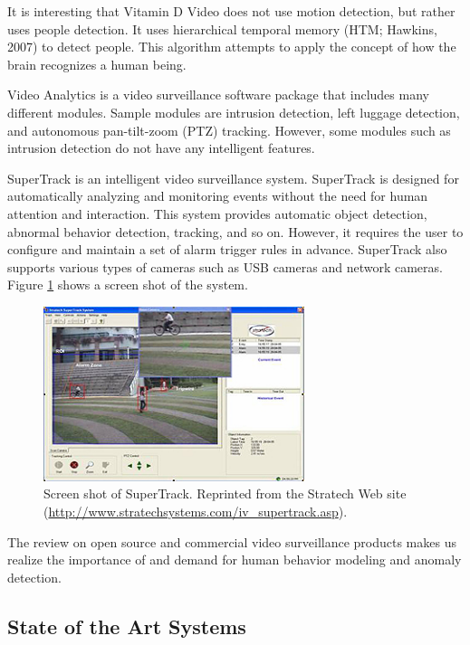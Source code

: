 It is interesting that Vitamin D Video does not use motion detection,
but rather uses people detection. It uses hierarchical temporal memory
(HTM; Hawkins, 2007)\nocite{jeff07htm} to detect people. This
algorithm attempts to apply the concept of how the brain recognizes a
human being.

Video Analytics  is a video surveillance software package that
includes many different modules.  Sample modules are intrusion detection, left
luggage detection, and autonomous pan-tilt-zoom (PTZ) tracking.  However, some
modules such as intrusion detection do not have any intelligent features.

SuperTrack  is an intelligent video surveillance
system. SuperTrack is designed for automatically analyzing and
monitoring events without the need for human attention and
interaction. This system provides automatic object detection, abnormal
behavior detection, tracking, and so on. However, it requires the user
to configure and maintain a set of alarm trigger rules in
advance. SuperTrack also supports various types of cameras such as USB
cameras and network cameras.  Figure \ref{fig:supertrack} shows a
screen shot of the system.

\begin{figure}[t]
  \begin{center}
    \includegraphics[width=3in]{figures/supertrack.jpg}
    \caption[Screen shot of SuperTrack.]{\small Screen shot of
      SuperTrack. Reprinted from the Stratech Web site
      (\url{http://www.stratechsystems.com/iv_supertrack.asp}).}
    \label{fig:supertrack}
  \end{center}
\end{figure}

The review on open source and commercial video surveillance 
products makes us realize the importance of and demand for human 
behavior modeling and anomaly detection. 

\subsection{State of the Art Systems}

